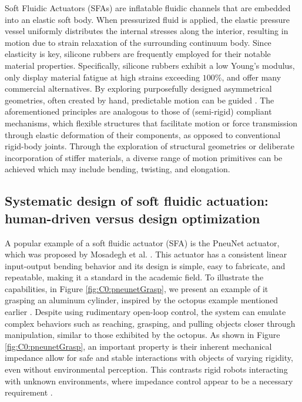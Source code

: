Soft Fluidic Actuators (SFAs) are inflatable fluidic channels that are embedded into an elastic soft body. When pressurized fluid is applied, the elastic pressure vessel uniformly distributes the internal stresses along the interior, resulting in motion due to strain relaxation of the surrounding continuum body. Since elasticity is key, silicone rubbers are frequently employed for their notable material properties. Specifically, silicone rubbers exhibit a low Young's modulus, only display material fatigue at high strains exceeding $100\%$, and offer many commercial alternatives. By exploring purposefully designed asymmetrical geometries, often created by hand, predictable motion can be guided \cite{Xavier2022Jun,Rus2015,Hughes2016Nov}. The aforementioned principles are analogous to those of (semi-rigid) compliant mechanisms, which flexible structures that facilitate motion or force transmission through elastic deformation of their components, as opposed to conventional rigid-body joints. Through the exploration of structural geometries or deliberate incorporation of stiffer materials, a diverse range of motion primitives can be achieved which may include bending, twisting, and elongation.

\subsection[Human-driven design versus design optimization]{Systematic design of soft fluidic actuation: human-driven versus design optimization}
A popular example of a soft fluidic actuator (SFA) is the PneuNet actuator, which was proposed by Mosadegh et al. \cite{Mosadegh2014}. This actuator has a consistent linear input-output bending behavior and its design is simple, easy to fabricate, and repeatable, making it a standard in the academic field. To illustrate the capabilities, in Figure \ref{fig:C0:pneunetGrasp}, we present an example of it grasping an aluminum cylinder, inspired by the octopus example mentioned earlier \cite{Sumbre2001Sep}. Despite using rudimentary open-loop control, the system can emulate complex behaviors such as reaching, grasping, and pulling objects closer through manipulation, similar to those exhibited by the octopus. As shown in Figure \ref{fig:C0:pneunetGrasp}, an important property is their inherent mechanical impedance allow for safe and stable interactions with objects of varying rigidity, even without environmental perception. This contrasts rigid robots interacting with unknown environments, where impedance control appear to be a necessary requirement \cite{Murray1994,DeLuca2016Jul}.

